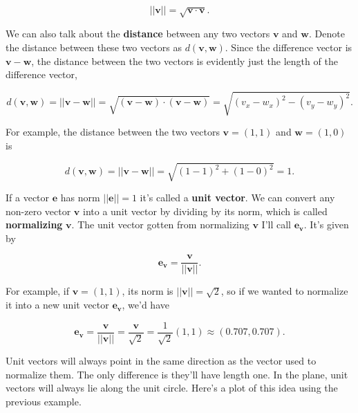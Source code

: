 \documentclass[
  letterpaper,
  DIV=11,
  numbers=noendperiod]{scrreprt}
\begin{document}
\[||\mathbf{v}|| = \sqrt{\mathbf{v} \cdot \mathbf{v}}.\]

We can also talk about the \textbf{distance} between any two vectors
\(\mathbf{v}\) and \(\mathbf{w}\). Denote the distance between these two
vectors as \(d(\mathbf{v}, \mathbf{w})\). Since the difference vector is
\(\mathbf{v} - \mathbf{w}\), the distance between the two vectors is
evidently just the length of the difference vector,

\[d(\mathbf{v}, \mathbf{w}) = ||\mathbf{v} - \mathbf{w}|| = \sqrt{(\mathbf{v} - \mathbf{w}) \cdot (\mathbf{v} - \mathbf{w})} = \sqrt{(v_x-w_x)^2 - (v_y-w_y)^2}.\]

For example, the distance between the two vectors \(\mathbf{v}=(1,1)\)
and \(\mathbf{w}=(1, 0)\) is

\[d(\mathbf{v}, \mathbf{w}) = ||\mathbf{v} - \mathbf{w}|| = \sqrt{(1-1)^2 + (1-0)^2} = 1.\]

If a vector \(\mathbf{e}\) has norm \(||\mathbf{e}||=1\) it's called a
\textbf{unit vector}. We can convert any non-zero vector \(\mathbf{v}\)
into a unit vector by dividing by its norm, which is called
\textbf{normalizing} \(\mathbf{v}\). The unit vector gotten from
normalizing \(\mathbf{v}\) I'll call \(\mathbf{e_v}\). It's given by

\[\mathbf{e_v} = \frac{\mathbf{v}}{||\mathbf{v}||}.\]

For example, if \(\mathbf{v}=(1,1)\), its norm is
\(||\mathbf{v}||=\sqrt{2}\), so if we wanted to normalize it into a new
unit vector \(\mathbf{e_v}\), we'd have

\[\mathbf{e_v} = \frac{\mathbf{v}}{||\mathbf{v}||} = \frac{\mathbf{v}}{\sqrt{2}} = \frac{1}{\sqrt{2}}(1,1) \approx (0.707, 0.707).\]

Unit vectors will always point in the same direction as the vector used
to normalize them. The only difference is they'll have length one. In
the plane, unit vectors will always lie along the unit circle. Here's a
plot of this idea using the previous example.
\end{document}
